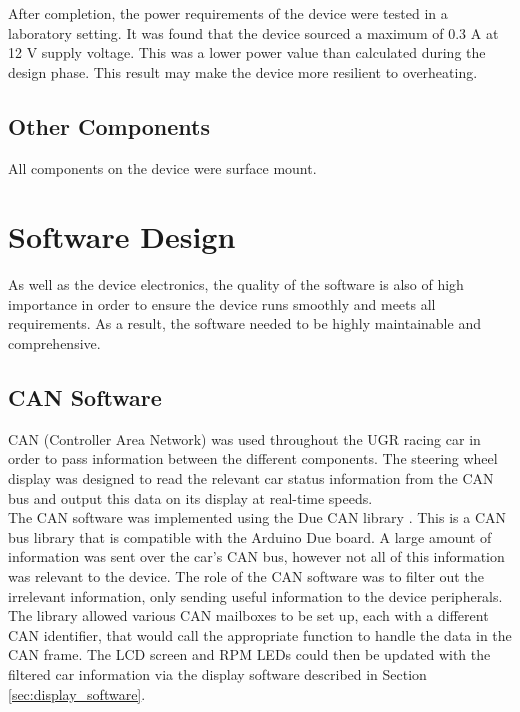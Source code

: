 \documentclass[a4paper,12pt]{article}
\begin{document}
After completion, the power requirements of the device were tested in a laboratory setting. It was found that the device sourced a maximum of 0.3 A at 12 V supply voltage. This was a lower power value than calculated during the design phase. This result may make the device more resilient to overheating.

\subsection{Other Components}
\label{sec:other_components}

All components on the device were surface mount.


\newpage
\section{Software Design}
\label{sec:software_design}

As well as the device electronics, the quality of the software is also of high importance in order to ensure the device runs smoothly and meets all requirements. As a result, the software needed to be highly maintainable and comprehensive.

\subsection{CAN Software}
\label{sec:CAN_software}

CAN (Controller Area Network) was used throughout the UGR racing car in order to pass information between the different components. The steering wheel display was designed to read the relevant car status information from the CAN bus and output this data on its display at real-time speeds. \\

The CAN software was implemented using the Due CAN library \cite{due_can}. This is a CAN bus library that is compatible with the Arduino Due board. A large amount of information was sent over the car’s CAN bus, however not all of this information was relevant to the device. The role of the CAN software was to filter out the irrelevant information, only sending useful information to the device peripherals. The library allowed various CAN mailboxes to be set up, each with a different CAN identifier, that would call the appropriate function to handle the data in the CAN frame. The LCD screen and RPM LEDs could then be updated with the filtered car information via the display software described in Section \ref{sec:display_software}. \\
\end{document}

